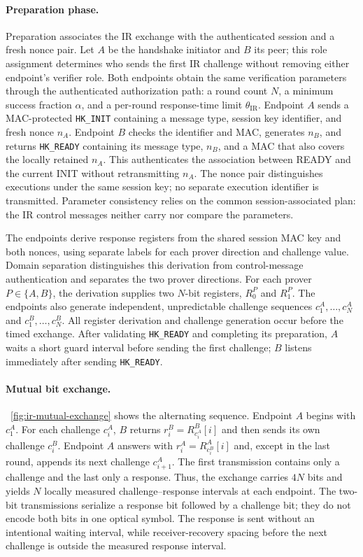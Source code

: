 \documentclass[sigconf,authordraft]{acmart}
\begin{document}
\paragraph{Preparation phase.}
Preparation associates the IR exchange with the authenticated session and a fresh nonce pair.
Let $A$ be the handshake initiator and $B$ its peer; this role assignment determines who sends the first IR challenge without removing either endpoint's verifier role.
Both endpoints obtain the same verification parameters through the authenticated authorization path: a round count $N$, a minimum success fraction $\alpha$, and a per-round response-time limit $\theta_{\mathrm{IR}}$.
Endpoint $A$ sends a MAC-protected \texttt{HK\_INIT} containing a message type, session key identifier, and fresh nonce $n_A$.
Endpoint $B$ checks the identifier and MAC, generates $n_B$, and returns \texttt{HK\_READY} containing its message type, $n_B$, and a MAC that also covers the locally retained $n_A$.
This authenticates the association between READY and the current INIT without retransmitting $n_A$.
The nonce pair distinguishes executions under the same session key; no separate execution identifier is transmitted.
Parameter consistency relies on the common session-associated plan: the IR control messages neither carry nor compare the parameters.

The endpoints derive response registers from the shared session MAC key and both nonces, using separate labels for each prover direction and challenge value.
Domain separation distinguishes this derivation from control-message authentication and separates the two prover directions.
For each prover $P\in\{A,B\}$, the derivation supplies two $N$-bit registers, $R^P_0$ and $R^P_1$.
The endpoints also generate independent, unpredictable challenge sequences $c^A_1,\ldots,c^A_N$ and $c^B_1,\ldots,c^B_N$.
All register derivation and challenge generation occur before the timed exchange.
After validating \texttt{HK\_READY} and completing its preparation, $A$ waits a short guard interval before sending the first challenge; $B$ listens immediately after sending \texttt{HK\_READY}.

\paragraph{Mutual bit exchange.}
\figurename~\ref{fig:ir-mutual-exchange} shows the alternating sequence.
Endpoint $A$ begins with $c^A_1$.
For each challenge $c^A_i$, $B$ returns $r^B_i=R^B_{c^A_i}[i]$ and then sends its own challenge $c^B_i$.
Endpoint $A$ answers with $r^A_i=R^A_{c^B_i}[i]$ and, except in the last round, appends its next challenge $c^A_{i+1}$.
The first transmission contains only a challenge and the last only a response.
Thus, the exchange carries $4N$ bits and yields $N$ locally measured challenge--response intervals at each endpoint.
The two-bit transmissions serialize a response bit followed by a challenge bit; they do not encode both bits in one optical symbol.
The response is sent without an intentional waiting interval, while receiver-recovery spacing before the next challenge is outside the measured response interval.
\end{document}
